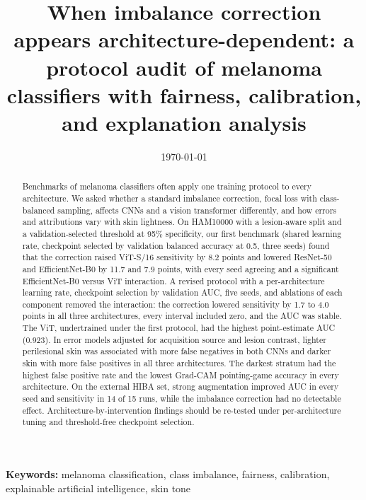 \documentclass[11pt]{article}
\title{When imbalance correction appears architecture-dependent: a protocol audit of melanoma classifiers with fairness, calibration, and explanation analysis}
\author{}
\date{\today}
\begin{document}
\maketitle

\begin{abstract}
Benchmarks of melanoma classifiers often apply one training protocol to every architecture. We asked whether a standard imbalance correction, focal loss with class-balanced sampling, affects CNNs and a vision transformer differently, and how errors and attributions vary with skin lightness. On HAM10000 with a lesion-aware split and a validation-selected threshold at 95\% specificity, our first benchmark (shared learning rate, checkpoint selected by validation balanced accuracy at 0.5, three seeds) found that the correction raised ViT-S/16 sensitivity by 8.2 points and lowered ResNet-50 and EfficientNet-B0 by 11.7 and 7.9 points, with every seed agreeing and a significant EfficientNet-B0 versus ViT interaction. A revised protocol with a per-architecture learning rate, checkpoint selection by validation AUC, five seeds, and ablations of each component removed the interaction: the correction lowered sensitivity by 1.7 to 4.0 points in all three architectures, every interval included zero, and the AUC was stable. The ViT, undertrained under the first protocol, had the highest point-estimate AUC (0.923). In error models adjusted for acquisition source and lesion contrast, lighter perilesional skin was associated with more false negatives in both CNNs and darker skin with more false positives in all three architectures. The darkest stratum had the highest false positive rate and the lowest Grad-CAM pointing-game accuracy in every architecture. On the external HIBA set, strong augmentation improved AUC in every seed and sensitivity in 14 of 15 runs, while the imbalance correction had no detectable effect. Architecture-by-intervention findings should be re-tested under per-architecture tuning and threshold-free checkpoint selection.
\end{abstract}

\noindent\textbf{Keywords:} melanoma classification, class imbalance, fairness, calibration, explainable artificial intelligence, skin tone












\end{document}
